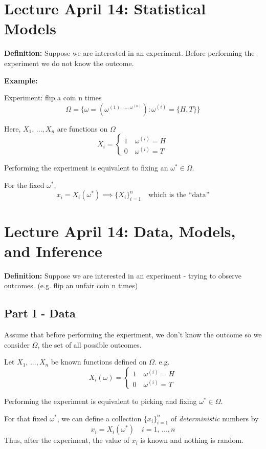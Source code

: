 \documentclass[12pt]{article}
\begin{document}
\section*{Lecture April 14: Statistical Models}
\textbf{Definition:} Suppose we are interested in an experiment. Before performing the experiment we do not know the outcome.

\textbf{Example:}

Experiment: flip a coin n times 
\[\Omega = \{\omega = (\omega^{(1), \, ..., \omega^{(n)}}) : \omega^{(i)} = \{H, T\}\} \]

Here, $X_1, \, ..., X_n$ are functions on $\Omega$ 
\[X_i = \begin{cases}
    1 \quad \omega^{(i)} = H\\
    0 \quad \omega^{(i)} = T
\end{cases}\]

Performing the experiment is equivalent to fixing an $\omega^* \in \Omega$. 

For the fixed $\omega^*$, 
\[x_i = X_i(\omega^*) \implies \{X_i\}_{i=1}^n \quad \text{which is the ``data''}\]

\section*{Lecture April 14: Data, Models, and Inference}
\textbf{Definition:} Suppose we are interested in an experiment - trying to observe outcomes. (e.g. flip an unfair coin n times)

\subsection*{Part I - Data}
Assume that before performing the experiment, we don't know the outcome so we consider $\Omega$, the set of all possible outcomes.

Let $X_1, \, ..., X_n$ be known functions defined on $\Omega$. e.g.
\[X_i(\omega) = \begin{cases}
    1 \quad \omega^{(i)} = H\\
    0 \quad \omega^{(i)} = T
\end{cases}\]

Performing the experiment is equivalent to picking and fixing $\omega^* \in \Omega$. 

For that fixed $\omega^*$, we can define a collection $\{x_i\}_{i=1}^n$ of \emph{deterministic} numbers by 
\[x_i = X_i(\omega^*) \quad i = 1, \, ..., n\]
Thus, after the experiment, the value of $x_i$ is known and nothing is random. 
\end{document}
